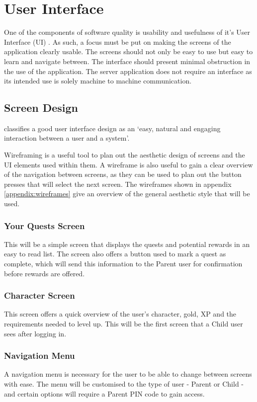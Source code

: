 \section{User Interface}
One of the components of software quality is usability and usefulness of it's User Interface (UI) \citep{isosoftwarequality}. 
As such, a focus must be put on making the screens of the application clearly usable.
The screens should not only be easy to use but easy to learn and navigate between. The interface should present minimal obstruction in the use of the application. 
The server application does not require an interface as its intended use is solely machine to machine communication.

\subsection{Screen Design}
\cite{stone2005user} classifies a good user interface design as an `easy, natural and engaging interaction between a user and a system'.

Wireframing is a useful tool to plan out the aesthetic design of screens and the UI elements used within them.
A wireframe is also useful to gain a clear overview of the navigation between screens, as they can be used to plan out the button presses that will select the next screen.
The wireframes shown in appendix \ref{appendix:wireframes} give an overview of the general aesthetic style that will be used.

\subsubsection{Your Quests Screen}
This will be a simple screen that displays the quests and potential rewards in an easy to read list.
The screen also offers a button used to mark a quest as complete, which will send this information to the Parent user for confirmation before rewards are offered.

\subsubsection{Character Screen}
This screen offers a quick overview of the user's character, gold, XP and the requirements needed to level up.
This will be the first screen that a Child user sees after logging in.

\subsubsection{Navigation Menu}
A navigation menu is necessary for the user to be able to change between screens with ease.
The menu will be customised to the type of user - Parent or Child - and certain options will require a Parent PIN code to gain access. 

